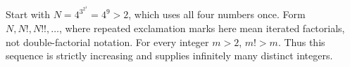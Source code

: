 Start with $N=4^{3^{2^1}}=4^9>2$, which uses all four numbers once. Form $N,N!,N!!,\ldots$, where repeated exclamation marks here mean iterated factorials, not double-factorial notation. For every integer $m>2$, $m!>m$. Thus this sequence is strictly increasing and supplies infinitely many distinct integers.
